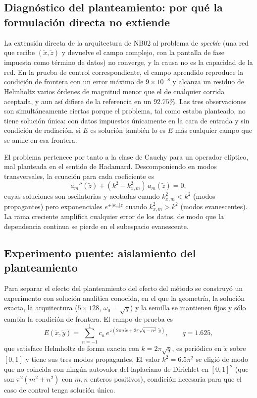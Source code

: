 \subsection{Diagnóstico del planteamiento: por qué la formulación directa no extiende}
\label{sec:nb03_diagnostico}

La extensión directa de la arquitectura de NB02 al problema de \textit{speckle}
(una red que recibe $(\tilde x,\tilde z)$ y devuelve el campo complejo, con la
pantalla de fase impuesta como término de datos) no converge, y la causa no es
la capacidad de la red. En la prueba de control correspondiente, el campo
aprendido reproduce la condición de frontera con un error máximo de
$9\times10^{-8}$ y alcanza un residuo de Helmholtz varios órdenes de magnitud
menor que el de cualquier corrida aceptada, y aun así difiere de la referencia
en un $92.75\%$. Las tres observaciones son simultáneamente ciertas porque el problema,
tal como estaba planteado, no tiene solución única: con datos impuestos
únicamente en la cara de entrada y sin condición de radiación, si $E$ es solución
también lo es $E$ más cualquier campo que se anule en esa frontera.

El problema pertenece por tanto a la clase de Cauchy para un operador elíptico,
mal planteada en el sentido de Hadamard. Descomponiendo en modos transversales,
la ecuación para cada coeficiente es
\begin{equation}
    a_m''(\tilde z) + (k^2-k_{x,m}^2)\,a_m(\tilde z) = 0 ,
    \label{eq:edo_modal}
\end{equation}
cuyas soluciones son oscilatorias y acotadas cuando $k_{x,m}^2<k^2$ (modos
propagantes) pero exponenciales $e^{\pm|\kappa_m|\tilde z}$ cuando
$k_{x,m}^2>k^2$ (modos evanescentes). La rama creciente amplifica cualquier error
de los datos, de modo que la dependencia continua se pierde en el subespacio
evanescente.

\subsection{Experimento puente: aislamiento del planteamiento}
\label{sec:nb02b_puente}

Para separar el efecto del planteamiento del efecto del método se construyó un
experimento con solución analítica conocida, en el que la geometría, la solución
exacta, la arquitectura ($5\times128$, $\omega_0=\sqrt{q}$) y la semilla se
mantienen fijos y sólo cambia la condición de frontera. El campo de prueba es
\begin{equation}
    E(\tilde x,\tilde y)=\sum_{n=-1}^{1} c_n\,
    e^{\,i\left(2\pi n\,\tilde x + 2\pi\sqrt{q-n^{2}}\;\tilde y\right)},
    \qquad q=1.625,
    \label{eq:campo_puente}
\end{equation}
que satisface Helmholtz de forma exacta con $k=2\pi\sqrt{q}$, es periódico en
$\tilde x$ sobre $[0,1]$ y tiene sus tres modos propagantes. El valor
$k^2=6.5\pi^2$ se eligió de modo que no coincida con ningún autovalor del
laplaciano de Dirichlet en $[0,1]^2$ (que son $\pi^2(m^2+n^2)$ con $m,n$
enteros positivos), condición necesaria para que el caso de control tenga
solución única.

